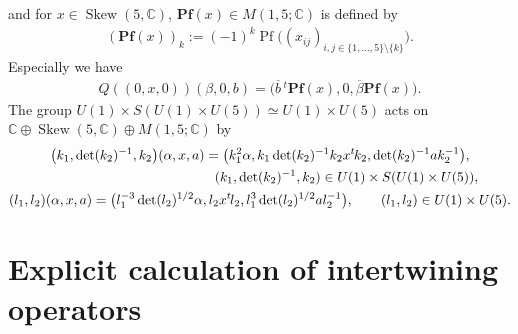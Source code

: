 \documentclass[pdftex]{sigma}
\numberwithin{equation}{section}
\newcommand{\BC}{\mathbb{C}}
\newcommand{\Pf}{\operatorname{Pf}}
\newcommand{\Skew}{\operatorname{Skew}}
\begin{document}
and for $x\in\Skew(5,\BC)$, $\mathbf{Pf}(x)\in M(1,5;\BC)$ is defined by
\begin{gather}\label{Pfaff_vector}
(\mathbf{Pf}(x))_k:=(-1)^k\Pf\big((x_{ij})_{i,j\in\{1,\ldots,5\}\setminus\{k\}}\big).
\end{gather}
Especially we have
\begin{gather*} Q((0,x,0))(\beta,0,b)=\big(\overline{b}\,{}^t\mathbf{Pf}(x),0,\overline{\beta}\mathbf{Pf}(x)\big). \end{gather*}
The group $U(1)\times S(U(1)\times U(5))\simeq U(1)\times U(5)$ acts on $\BC\oplus\Skew(5,\BC)\oplus M(1,5;\BC)$ by
\begin{gather*}
\big(k_1,\det(k_2)^{-1},k_2\big)(\alpha,x,a) =\big(k_1^2\alpha,k_1\det(k_2)^{-1}k_2x{}^t\hspace{-1pt}k_2,\det(k_2)^{-1}ak_2^{-1}\big),\\
\hphantom{\big(k_1,\det(k_2)^{-1},k_2\big)(\alpha,x,a) =}{} \ (k_1,\det(k_2)^{-1},k_2)\in U(1)\times S(U(1)\times U(5)),\\
(l_1,l_2)(\alpha,x,a) =\big(l_1^{-3}\det(l_2)^{1/2}\alpha,l_2x{}^t\hspace{-1pt}l_2,l_1^3\det(l_2)^{1/2}al_2^{-1}\big),\qquad
 (l_1,l_2)\in U(1)\times U(5).
\end{gather*}

\section{Explicit calculation of intertwining operators}\label{sect_examples}
\end{document}
